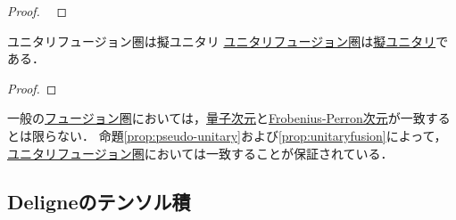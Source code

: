 \documentclass[TQFT_main]{subfiles}
\begin{document}
\begin{proof}
    ~\cite[PROPOSITION 9.5.1., p.284]{etingof2015tensor}
\end{proof}

\begin{myprop}[label=prop:unitaryfusion]{ユニタリフュージョン圏は擬ユニタリ}
    \hyperref[def:UFC]{ユニタリフュージョン圏}は\hyperref[def:pseudo-unitary]{擬ユニタリ}である．
\end{myprop}

\begin{proof}
    
\end{proof}

\begin{marker}
    一般の\hyperref[def:tensorfusion-cat]{フュージョン圏}においては，\hyperref[def:qdim]{量子次元}と\hyperref[def:FPdim]{Frobenius-Perron次元}が一致するとは限らない．
    命題\ref{prop:pseudo-unitary}および\ref{prop:unitaryfusion}によって，\hyperref[def:UFC]{ユニタリフュージョン圏}においては一致することが保証されている．
\end{marker}

\subsection{Deligneのテンソル積}
\end{document}
